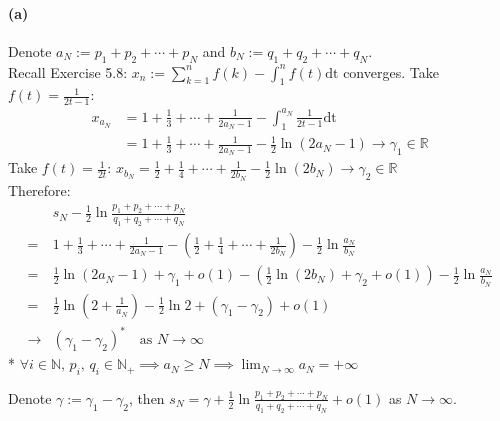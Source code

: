 \documentclass{article}
\def\to{\rightarrow}
\begin{document}
\paragraph{(a)}
Denote $a_N := p_1 + p_2 + \cdots + p_N$ and $b_N := q_1 + q_2 + \cdots + q_N$.
\\
Recall Exercise 5.8: $x_n := \sum_{k=1}^{n} f(k) - \int_{1}^{n} f(t) \mathrm{dt}$ converges.
Take $f(t) = \frac{1}{2t-1}$:
$$\begin{aligned}
    x_{a_N} &= 1 + \frac{1}{3} + \cdots + \frac{1}{2a_N-1} - \int_{1}^{a_N} \frac{1}{2t-1} \mathrm{dt} \\
    &= 1 + \frac{1}{3} + \cdots + \frac{1}{2a_N-1} - \frac{1}{2}\ln(2a_N-1) \to \gamma_1 \in \mathbb{R}
\end{aligned}$$
Take $f(t) = \frac{1}{2t}$: $x_{b_N} = \frac{1}{2} + \frac{1}{4} + \cdots + \frac{1}{2b_N} - \frac{1}{2}\ln(2b_N) \to \gamma_2 \in \mathbb{R}$
\\
Therefore:
$$\begin{aligned}
    &s_N - \frac{1}{2} \ln{\frac{p_1 + p_2 + \cdots + p_N}{q_1 + q_2 + \cdots + q_N}} \\
    =& 1 + \frac{1}{3} + \cdots + \frac{1}{2a_N-1} - \left( \frac{1}{2} + \frac{1}{4} + \cdots + \frac{1}{2b_N} \right) - \frac{1}{2} \ln{\frac{a_N}{b_N}} \\
    =& \frac{1}{2} \ln(2a_N-1) + \gamma_1 + o(1) - \left( \frac{1}{2}\ln(2b_N) + \gamma_2 + o(1) \right) - \frac{1}{2} \ln{\frac{a_N}{b_N}} \\
    =& \frac{1}{2} \ln\left(2+\frac{1}{a_N}\right) - \frac{1}{2} \ln{2} + (\gamma_1 - \gamma_2) + o(1) \\
    \to & (\gamma_1 - \gamma_2)^* \quad \text{as } N \to \infty
\end{aligned}$$
* $\forall i \in \mathbb{N} ,\, p_i ,\, q_i \in \mathbb{N_+} \implies a_N \ge N \implies \lim_{N\to\infty} a_N = +\infty$

Denote $\gamma := \gamma_1 - \gamma_2$, then $s_N = \gamma + \frac{1}{2} \ln{\frac{p_1 + p_2 + \cdots + p_N}{q_1 + q_2 + \cdots + q_N}} + o(1)$ as $N\to\infty$.
\end{document}
